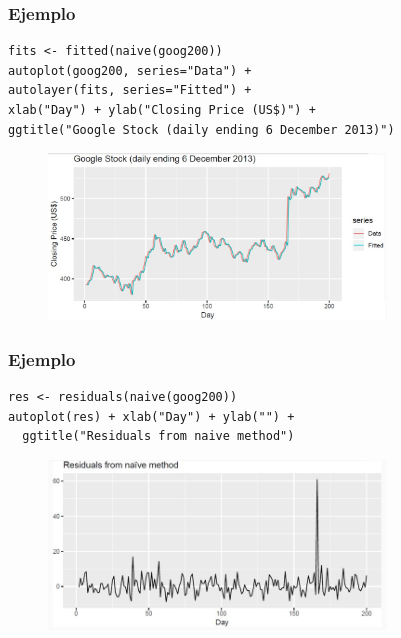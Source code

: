\documentclass[10pt]{beamer}
\begin{document}




\begin{frame}[fragile]
\frametitle{Ejemplo}


\begin{lstlisting}
fits <- fitted(naive(goog200))
autoplot(goog200, series="Data") +
autolayer(fits, series="Fitted") +
xlab("Day") + ylab("Closing Price (US$)") +
ggtitle("Google Stock (daily ending 6 December 2013)")
\end{lstlisting}

\pause


\begin{figure}
\begin{center}
    \includegraphics[width=0.8\textwidth]{Imagen12.JPG}
\end{center}
\end{figure}


\end{frame}







\begin{frame}[fragile]
\frametitle{Ejemplo}


\begin{lstlisting}
res <- residuals(naive(goog200))
autoplot(res) + xlab("Day") + ylab("") +
  ggtitle("Residuals from naive method")
\end{lstlisting}

\pause


\begin{figure}
\begin{center}
    \includegraphics[width=0.8\textwidth]{Imagen13.JPG}
\end{center}
\end{figure}


\end{frame}
\end{document}
